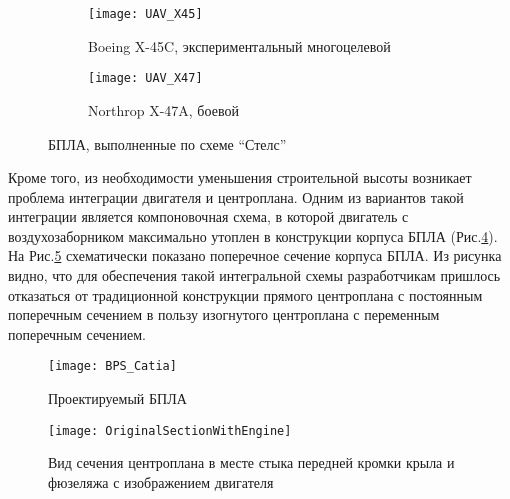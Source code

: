 \begin{figure}[ht]
        \begin{subfigure}[b]{0.47\textwidth}
                \texttt{[image: UAV\_X45]}
                \caption{Boeing X-45C, экспериментальный многоцелевой}
                \label{fig:UAV_X45}
        \end{subfigure}%
        \hspace{\fill}
        \begin{subfigure}[b]{0.47\textwidth}
                \texttt{[image: UAV\_X47]}
                \caption{Northrop X-47A, боевой} %
                \label{fig:UAV_X47}
        \end{subfigure}%
        \caption{БПЛА, выполненные по схеме ``Стелс''}\label{fig:UAVs_stealth}
\end{figure}

Кроме того, из необходимости уменьшения строительной высоты возникает проблема интеграции двигателя и центроплана. Одним из вариантов такой интеграции является компоновочная схема, в которой двигатель с воздухозаборником максимально утоплен в конструкции корпуса БПЛА (Рис.\ref{fig:BPS}). На Рис.\ref{fig:OriginalSectionWithEngine} схематически показано поперечное сечение корпуса БПЛА. Из рисунка видно, что для обеспечения такой интегральной схемы разработчикам пришлось отказаться от традиционной конструкции прямого центроплана с постоянным поперечным сечением в пользу изогнутого центроплана с переменным поперечным сечением.



\begin{figure}[ht]
\centering
\texttt{[image: BPS\_Catia]}
\caption{Проектируемый БПЛА}
\label{fig:BPS}
\end{figure}




\begin{figure}[ht]
\captionsetup{justification=centering}
\centering
\texttt{[image: OriginalSectionWithEngine]}
%
\caption{Вид сечения центроплана в месте стыка передней кромки крыла и фюзеляжа с изображением двигателя}
\label{fig:OriginalSectionWithEngine}
\end{figure}



